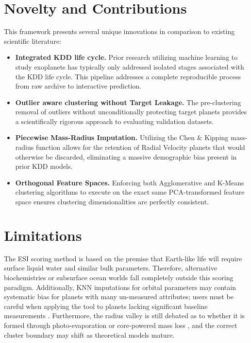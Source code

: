 \documentclass[conference]{IEEEtran}
\begin{document}
\section{Novelty and Contributions}
This framework presents several unique innovations in comparison to existing scientific literature:
\begin{itemize}
    \item[\textbf{(i)}] \textbf{Integrated KDD life cycle.} Prior research utilizing machine learning to study exoplanets has typically only addressed isolated stages associated with the KDD life cycle. This pipeline addresses a complete reproducible process from raw archive to interactive prediction.
    \item[\textbf{(ii)}] \textbf{Outlier aware clustering without Target Leakage.} The pre-clustering removal of outliers without unconditionally protecting target planets provides a scientifically rigorous approach to evaluating validation datasets.
    \item[\textbf{(iii)}] \textbf{Piecewise Mass-Radius Imputation.} Utilizing the Chen \& Kipping mass-radius function allows for the retention of Radial Velocity planets that would otherwise be discarded, eliminating a massive demographic bias present in prior KDD models.
    \item[\textbf{(iv)}] \textbf{Orthogonal Feature Spaces.} Enforcing both Agglomerative and K-Means clustering algorithms to execute on the exact same PCA-transformed feature space ensures clustering dimensionalities are perfectly consistent.
\end{itemize}

\section{Limitations}
The ESI scoring method is based on the premise that Earth-like life will require surface liquid water and similar bulk parameters. Therefore, alternative biochemistries or subsurface ocean worlds fall completely outside this scoring paradigm. Additionally, KNN imputations for orbital parameters may contain systematic bias for planets with many un-measured attributes; users must be careful when applying the tool to planets lacking significant baseline measurements \cite{lalande2024}. Furthermore, the radius valley is still debated as to whether it is formed through photo-evaporation or core-powered mass loss \cite{rogers2021}, and the correct cluster boundary may shift as theoretical models mature.
\end{document}
